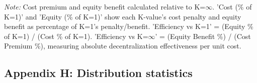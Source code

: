 \documentclass[preprint,12pt,nopreprintline]{elsarticle}
\begin{document}
\begin{table}[htbp]
\centering
\caption{Cost-Equity Trade-off Across All K-Constraint Levels (Part 4: 100\% Decarbonization)}
\label{tab:cost_equity_all_k_part4}
\small
{}
\begin{tablenotes}
\small
\item \textit{Note:} Cost premium and equity benefit calculated relative to K=$\infty$. 
'Cost (\% of K=1)' and 'Equity (\% of K=1)' show each K-value's cost penalty and equity benefit as percentage of K=1's penalty/benefit. 
'Efficiency vs K=1' = (Equity \% of K=1) / (Cost \% of K=1). 
'Efficiency vs K=$\infty$' = (Equity Benefit \%) / (Cost Premium \%), measuring absolute decentralization effectiveness per unit cost.
\end{tablenotes}
\end{table}
\newpage

\subsection{Appendix H: Distribution statistics} \label{Appendix_H}
\end{document}
